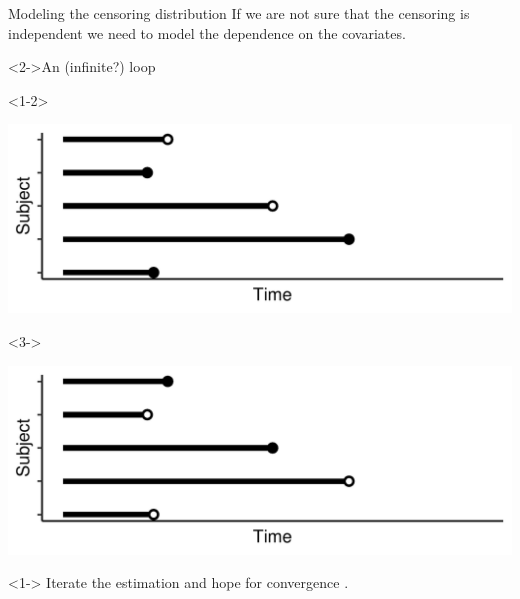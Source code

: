 \documentclass[smaller]{beamer}\usepackage{listings}
\begin{document}
\begin{frame}[label={sec:org21faac7}]{Modeling the censoring distribution}
\small If we are not sure that the censoring is independent we need to model the dependence on the
covariates. \vfill


\begin{block}<2->{\centering An (infinite?) loop}
\begin{onlyenv}<1-2>
\pause

\begin{center}
\includegraphics[width=.9\linewidth]{./fig-obs-data.pdf}
\end{center}
\end{onlyenv}

\begin{onlyenv}<3->
\begin{center}
\includegraphics[width=.9\linewidth]{./fig-inverse-data.pdf}
\end{center}
\end{onlyenv}
\end{block}


\begin{onlyenv}<1->
\pause \pause Iterate the estimation and hope for convergence
\citep{han2021inverse,westling2021inference}.
\end{onlyenv}
\end{frame}
\end{document}
